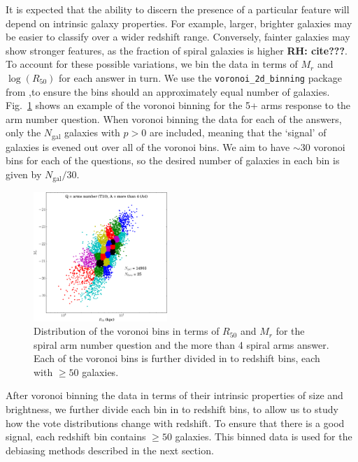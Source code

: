 \documentclass[useAMS,usenatbib]{mn2e}
\newcommand{\rh}[1]{{\bf \textcolor{RoyalPurple}{RH: #1}}}
\begin{document}
It is expected that the ability to discern the presence of a particular feature will depend on intrinsic galaxy properties.  For example, larger, brighter galaxies may be easier to classify over a wider redshift range. Conversely, fainter galaxies may show stronger features, as the fraction of spiral galaxies is higher \rh{cite???}. To account for these possible variations, we bin the data in terms of $M_r$ and $\log(R_{50})$ for each answer in turn. We use the \texttt{voronoi\_2d\_binning} package from \cite{Cappellari_03},to ensure the bins should an approximately equal number of galaxies. Fig.~\ref{fig:voronoi_bins} shows an example of the voronoi binning for the 5+ arms response to the arm number question. When voronoi binning the data for each of the answers, only the $N_{\mathrm{gal}}$ galaxies with $p>0$ are included, meaning that the `signal' of galaxies is evened out over all of the voronoi bins. We aim to have $\sim 30$ voronoi bins for each of the questions, so the desired number of galaxies in each bin is given by $N_{\mathrm{gal}}/30$.

\begin{figure}
		\centering

        \includegraphics[width=0.45\textwidth]{Images/Bias/Debiasing/voronoi_bins.pdf}

        \caption{Distribution of the voronoi bins in terms of $R_{50}$ and $M_r$ for the spiral arm number question and the more than 4 spiral arms answer. Each of the voronoi bins is further divided in to redshift bins, each with $\geq 50$ galaxies.}

        \label{fig:voronoi_bins}

\end{figure}

After voronoi binning the data in terms of their intrinsic properties of size and brightness, we further divide each bin in to redshift bins, to allow us to study how the vote distributions change with redshift. To ensure that there is a good signal, each redshift bin contains $\geq 50$ galaxies. This binned data is used for the debiasing methods described in the next section.
\end{document}
